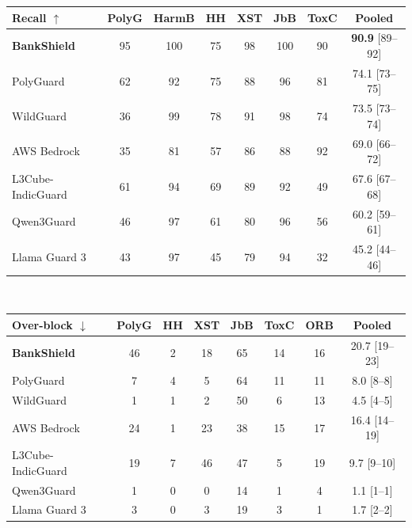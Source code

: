 \documentclass[11pt]{article}
\begin{document}
\begin{table}[t]
\centering\small\setlength{\tabcolsep}{6pt}
\begin{tabular}{lccccccc}
\hline
\textbf{Recall $\uparrow$} & \textbf{PolyG} & \textbf{HarmB} & \textbf{HH} & \textbf{XST} & \textbf{JbB} & \textbf{ToxC} & \textbf{Pooled} \\
\hline
\textbf{BankShield} & 95 & 100 & 75 & 98 & 100 & 90 & \textbf{90.9} {\footnotesize[89--92]} \\
PolyGuard           & 62 & 92  & 75 & 88 & 96  & 81 & 74.1 {\footnotesize[73--75]} \\
WildGuard           & 36 & 99  & 78 & 91 & 98  & 74 & 73.5 {\footnotesize[73--74]} \\
AWS Bedrock         & 35 & 81  & 57 & 86 & 88  & 92 & 69.0 {\footnotesize[66--72]} \\
L3Cube-IndicGuard   & 61 & 94  & 69 & 89 & 92  & 49 & 67.6 {\footnotesize[67--68]} \\
Qwen3Guard          & 46 & 97  & 61 & 80 & 96  & 56 & 60.2 {\footnotesize[59--61]} \\
Llama Guard 3       & 43 & 97  & 45 & 79 & 94  & 32 & 45.2 {\footnotesize[44--46]} \\
\hline
\end{tabular}\\[6pt]
\begin{tabular}{lccccccc}
\hline
\textbf{Over-block $\downarrow$} & \textbf{PolyG} & \textbf{HH} & \textbf{XST} & \textbf{JbB} & \textbf{ToxC} & \textbf{ORB} & \textbf{Pooled} \\
\hline
\textbf{BankShield} & 46 & 2 & 18 & 65 & 14 & 16 & 20.7 {\footnotesize[19--23]} \\
PolyGuard           & 7  & 4 & 5  & 64 & 11 & 11 & 8.0  {\footnotesize[8--8]} \\
WildGuard           & 1  & 1 & 2  & 50 & 6  & 13 & 4.5  {\footnotesize[4--5]} \\
AWS Bedrock         & 24 & 1 & 23 & 38 & 15 & 17 & 16.4 {\footnotesize[14--19]} \\
L3Cube-IndicGuard   & 19 & 7 & 46 & 47 & 5  & 19 & 9.7  {\footnotesize[9--10]} \\
Qwen3Guard          & 1  & 0 & 0  & 14 & 1  & 4  & 1.1  {\footnotesize[1--1]} \\
Llama Guard 3       & 3  & 0 & 3  & 19 & 3  & 1  & 1.7  {\footnotesize[2--2]} \\
\hline
\end{tabular}

\end{table}
\end{document}

